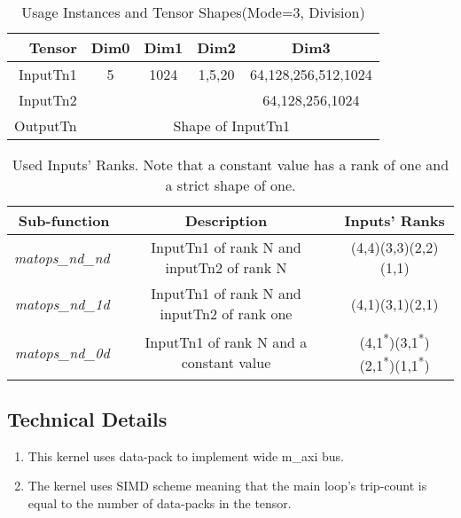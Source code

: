 \begin{table}[htbp]
\caption{Usage Instances and Tensor Shapes(Mode=3, Division)}
\label{tab:shapes_matops3}
	\begin{center}
		\begin{tabular}{|r|c|c|c|c|} 
		\hline	
		Tensor  & Dim0 & Dim1 & Dim2 & Dim3\\ 
		\hline	
		InputTn1 &
			5&
			1024&
			1,5,20&
			64,128,256,512,1024\\
		\hline	
		InputTn2 &
			&
			&
			&
			64,128,256,1024\\	
		\hline
		OutputTn &
			\multicolumn{4}{|c|}{Shape of InputTn1} \\
		\hline
		\end{tabular}
	\end{center}
\end{table}

\begin{table}[htbp]
	\caption{Used Inputs' Ranks. Note that a constant value has a rank of one and a strict shape of one.}
	\label{tab:ransk_matops}
	\begin{center}
		\begin{tabular}{|r|c|c|} 
			\hline	
			Sub-function  & Description & Inputs' Ranks\\ 
			\hline	
			\emph{matops\_nd\_nd} &
			InputTn1 of rank N and inputTn2 of rank N&
			(4,4)(3,3)(2,2)(1,1)\\
			\hline
			\emph{matops\_nd\_1d} &
			InputTn1 of rank N and inputTn2 of rank one&
			(4,1)(3,1)(2,1)\\
			\hline
			\emph{matops\_nd\_0d} &
			InputTn1 of rank N and a constant value&
			(4,1\textsuperscript{*})(3,1\textsuperscript{*})(2,1\textsuperscript{*})(1,1\textsuperscript{*})\\
			\hline
		\end{tabular}
	\end{center}
\end{table}
\vspace{2 cm}

\subsection{Technical Details}
\begin{enumerate}
\item This kernel uses data-pack to implement wide m\_axi bus.
\item The kernel uses SIMD scheme meaning that the main loop's trip-count is equal to the number of data-packs in the tensor.
\end{enumerate}






